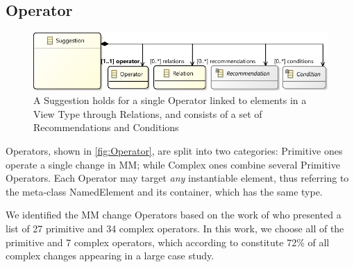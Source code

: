 \subsection{Operator}
\label{sec:Suggestion:Operator}

\begin{figure}[t]
    \centering
     \includegraphics[width=\columnwidth]{images/Suggestion.pdf}
    \caption{A \textsf{Suggestion} holds for a single \textsf{Operator}%
    linked to 
		elements in a View Type through \textsf{Relation}s, and consists of a set of \textsf{Recommendation}s and \textsf{Condition}s} 
		\label{fig:Suggestion}
\end{figure}

\textsf{Operator}s, shown in \cref{fig:Operator}, are split into two categories:
\textsf{Primitive} ones operate a single change in \textsf{MM}; while
\textsf{Complex} ones combine several \textsf{Primitive} \textsf{Operator}s.
Each \textsf{Operator} may target \emph{any} instantiable \metamodel element, 
thus referring to the meta-class \textsf{NamedElement} and its container, which has the same type.

We identified the MM change \textsf{Operator}s based on the work of \textcite{herrmannsdoerfer_extensive_2011} who presented a list of 27 primitive and 34 complex operators. In this work, we choose all of the primitive and 7 complex operators, which according to \textcite{khelladi_detecting_2015} constitute 72\% of all complex changes appearing in a large case study.



